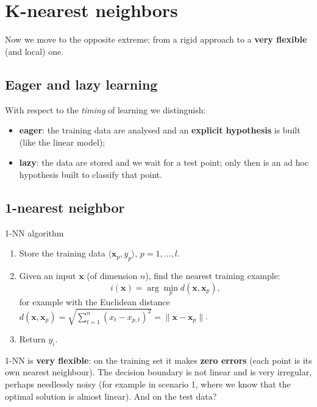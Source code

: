 \section{K-nearest neighbors}\label{k-nearest-neighbors}

Now we move to the opposite extreme: from a rigid approach to a
\textbf{very flexible} (and local) one.

\subsection{Eager and lazy
learning}\label{apprendimento-eager-e-lazy}

With respect to the \emph{timing} of learning we distinguish:

\begin{itemize}
\tightlist
\item
  \textbf{eager}: the training data are analysed and an
  \textbf{explicit hypothesis} is built (like the linear model);
\item
  \textbf{lazy}: the data are stored and we wait for a test point;
  only then is an ad hoc hypothesis built to classify that point.
\end{itemize}

\subsection{1-nearest neighbor}\label{nearest-neighbor}

\begin{boxdefinition}{1-NN algorithm}

\begin{enumerate}
\def\labelenumi{\arabic{enumi}.}
\tightlist
\item
  Store the training data \(\langle \mathbf{x}_p, y_p\rangle\),
  \(p = 1,\dots,l\).
\item
  Given an input \(\mathbf{x}\) (of dimension \(n\)), find the nearest
  training example: \[
  i(\mathbf{x}) = \arg\min_p d(\mathbf{x}, \mathbf{x}_p),
  \] for example with the Euclidean distance
  \(d(\mathbf{x}, \mathbf{x}_p) = \sqrt{\sum_{t=1}^{n}(x_t - x_{p,t})^2} = \|\mathbf{x} - \mathbf{x}_p\|\).
\item
  Return \(y_i\).
\end{enumerate}

\end{boxdefinition}

1-NN is \textbf{very flexible}: on the training set it makes
\textbf{zero errors} (each point is its own nearest neighbour). The
decision boundary is not linear and is very irregular, perhaps
needlessly noisy (for example in scenario 1, where we know that the
optimal solution is almost linear). And on the test data?

